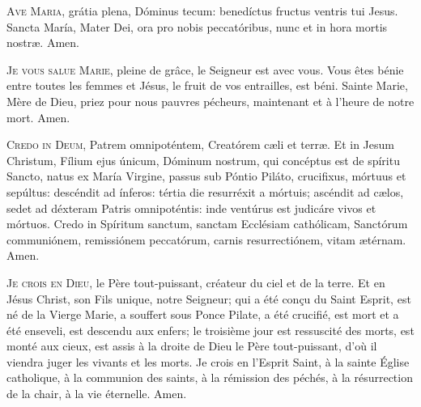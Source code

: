 \documentclass[psautier_nocturne_fr.tex]{subfiles}
\begin{document}
\begin{paracol}{2}
\switchcolumn*

\lettrine{A}{ve Maria}, grátia plena, Dóminus tecum: benedíctus fructus ventris tui Jesus. Sancta María, Mater Dei, ora pro nobis 
peccatóribus, nunc et in hora mortis nostræ. Amen.

\switchcolumn

\lettrine{J}{e vous salue Marie}, pleine de grâce, le Seigneur est avec vous.
Vous êtes bénie entre toutes les femmes et Jésus, le fruit de vos entrailles, est béni.
Sainte Marie, Mère de Dieu, priez pour nous pauvres pécheurs, maintenant et à l’heure de notre mort.
Amen.

\switchcolumn*

\lettrine{C}{redo in Deum}, Patrem omnipoténtem, Creatórem cæli et terræ. Et in Jesum Christum, Fílium ejus únicum, Dóminum nostrum,
qui concéptus est de spíritu Sancto, natus ex María Virgine, passus sub Póntio Piláto, crucifixus, mórtuus et sepúltus: descéndit
ad ínferos: tértia die resurréxit a mórtuis; ascéndit ad cælos, sedet ad déxteram Patris omnipoténtis: inde ventúrus est judicáre
vivos et mórtuos. Credo in Spíritum sanctum, sanctam Ecclésiam cathólicam, Sanctórum communiónem, remissiónem peccatórum,
carnis resurrectiónem, vitam ætérnam. Amen.

\switchcolumn

\lettrine{J}{e crois en Dieu}, le Père tout-puissant, créateur du ciel et de la terre.
Et en Jésus Christ, son Fils unique, notre Seigneur;
qui a été conçu du Saint Esprit, est né de la Vierge Marie,
a souffert sous Ponce Pilate, a été crucifié,
est mort et a été enseveli, est descendu aux enfers;
le troisième jour est ressuscité des morts,
est monté aux cieux, est assis à la droite de Dieu le Père tout-puissant,
d’où il viendra juger les vivants et les morts.
Je crois en l’Esprit Saint, à la sainte Église catholique, à la communion des saints,
à la rémission des péchés, à la résurrection de la chair, à la vie éternelle. Amen.

\end{paracol}

\end{document}
